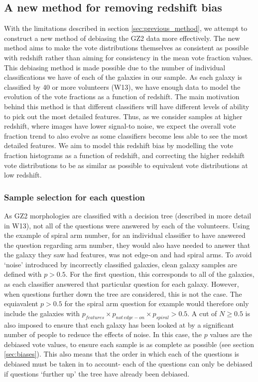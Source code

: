 \documentclass[useAMS,usenatbib]{mn2e}
\begin{document}
\subsection{A new method for removing redshift bias}
\label{sec:new_method}

With the limitations described in section \ref{sec:previous_method}, we attempt to construct a new method of debiasing the GZ2 data more effectively. The new method aims to make the vote distributions themselves as consistent  as possible with redshift rather than aiming for consistency in the mean vote fraction values. This debiasing method is made possible due to the number of individual classifications we have of each of the galaxies in our sample. As each galaxy is classified by 40 or more volunteers (W13), we have enough data to model the evolution of the vote fractions as a function of redshift. The main motivation behind this method is that different classifiers will have different levels of ability to pick out the most detailed features. Thus, as we consider samples at higher redshift, where images have lower signal-to noise, we expect the overall vote fraction trend to also evolve as some classifiers become less able to see the most detailed features. We aim to model this redshift bias by modelling the vote fraction histograms as a function of redshift, and correcting the higher redshift vote distributions to be as similar as possible to equivalent vote distributions at low redshift.

\subsubsection{Sample selection for each question}

As GZ2 morphologies are classified with a decision tree (described in more detail in W13), not all of the questions were answered by each of the volunteers. Using the example of spiral arm number, for an individual classifier to have answered the question regarding arm number, they would also have needed to answer that the galaxy they saw had features, was not edge-on and had spiral arms. To avoid `noise' introduced by incorrectly classified galaxies, clean galaxy samples are defined with $p > 0.5$. For the first question, this corresponds to all of the galaxies, as each classifier answered that particular question for each galaxy. However, when questions further down the tree are considered, this is not the case. The equiavalent $p>0.5$ for the spiral arm question for example would therefore only include the galaxies with $p_{features} \times p_{not \, edge-on} \times p_{spiral} > 0.5$. A cut of $N \geq 0.5$ is also imposed to ensure that each galaxy has been looked at by a significant number of people to redsuce the effects of noise. In this case, the $p$ values are the debiased vote values, to ensure each sample is as complete as possible (see section \ref{sec:biases}). This also means that the order in which each of the questions is debiased must be taken in to account- each of the questions can only be debiased if questions `further up' the tree have already been debiased.
\end{document}
